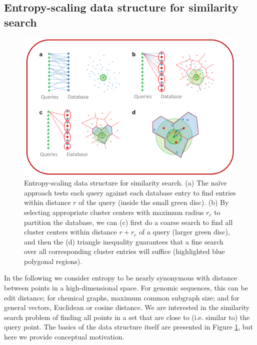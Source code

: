 \documentclass[review,preprint,12pt]{elsarticle}
\theoremstyle{definition}
\theoremstyle{remark}
\numberwithin{equation}{section}
\begin{document}
\subsection{Entropy-scaling data structure for similarity search}
\begin{figure}[btp]
    \centering
    \includegraphics[width=1\textwidth]{assets/dataStructure.png}
    \caption{ Entropy-scaling data structure for similarity search. %
            (a) The na\"ive approach tests each query against each database entry to find entries within distance $r$ of the query (inside the small green disc). %
            (b) By selecting appropriate cluster centers with maximum radius $r_c$ to partition the database, we can (c) first do a coarse search to find all cluster centers within distance $r+r_c$ of a query (larger green disc),%
 and then the (d) triangle inequality guarantees that a fine search over all corresponding cluster entries will suffice (highlighted blue polygonal regions).}
    \label{fig:dataStructure}
\end{figure}

In the following we consider entropy to be nearly synonymous with distance between points in a high-dimensional space.
For genomic sequences, this can be edit distance; for chemical graphs, maximum common subgraph size; and for general vectors, Euclidean or cosine distance.
We are interested in the similarity search problem of
finding all points in a set that are close to (i.e. similar to) the query point.
The basics of the data structure itself are presented in Figure \ref{fig:dataStructure}, but here we provide conceptual motivation.
\end{document}

